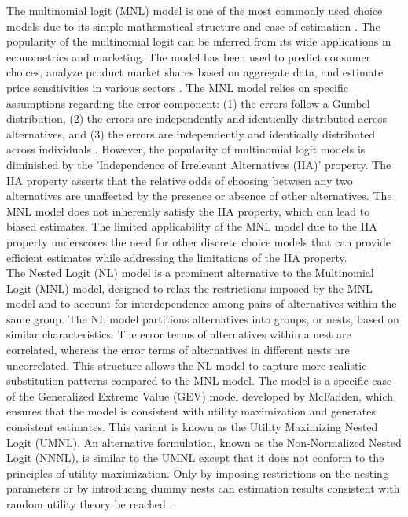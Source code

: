 \documentclass[a4paper,11pt]{article}
\begin{document}
   The multinomial logit (MNL) model is one of the most commonly used choice models due to its simple mathematical structure and ease of estimation \cite{Mcfadden1972}. The popularity of the multinomial logit can be inferred from its wide applications in econometrics and marketing. The model has been used to predict consumer choices, analyze product market shares based on aggregate data, and estimate price sensitivities in various sectors \cite{Li&Huh}. The MNL model relies on specific assumptions regarding the error component: (1) the errors follow a Gumbel distribution, (2) the errors are independently and identically distributed across alternatives, and (3) the errors are independently and identically distributed across individuals \cite{Koppelman&Bhat}. However, the popularity of multinomial logit models is diminished by the 'Independence of Irrelevant Alternatives (IIA)' property. The IIA property asserts that the relative odds of choosing between any two alternatives are unaffected by the presence or absence of other alternatives. The MNL model does not inherently satisfy the IIA property, which can lead to biased estimates. The limited applicability of the MNL model due to the IIA property underscores the need for other discrete choice models that can provide efficient estimates while addressing the limitations of the IIA property.\\

    The Nested Logit (NL) model is a prominent alternative to the Multinomial Logit (MNL) model, designed to relax the restrictions imposed by the MNL model and to account for interdependence among pairs of alternatives within the same group. The NL model partitions alternatives into groups, or nests, based on similar characteristics. The error terms of alternatives within a nest are correlated, whereas the error terms of alternatives in different nests are uncorrelated. This structure allows the NL model to capture more realistic substitution patterns compared to the MNL model. The model is a specific case of the Generalized Extreme Value (GEV) model developed by McFadden, which ensures that the model is consistent with utility maximization and generates consistent estimates. This variant is known as the Utility Maximizing Nested Logit (UMNL). An alternative formulation, known as the Non-Normalized Nested Logit (NNNL), is similar to the UMNL except that it does not conform to the principles of utility maximization. Only by imposing restrictions on the nesting parameters or by introducing dummy nests can estimation results consistent with random utility theory be reached \cite{silberhorn2008estimation}.\\
\end{document}
